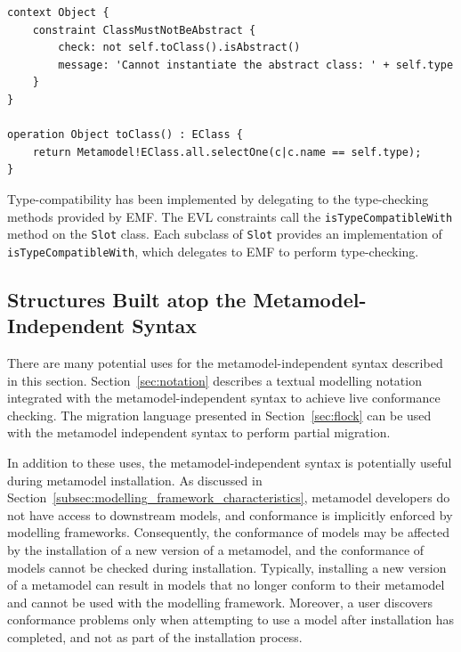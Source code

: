 \begin{lstlisting}[caption=A constraint (in EVL) to check that only concrete metamodel types are instantiated., label=lst:conformance_constraint, language=EVL]
context Object {
	constraint ClassMustNotBeAbstract {
		check: not self.toClass().isAbstract()
		message: 'Cannot instantiate the abstract class: ' + self.type
	}
}

operation Object toClass() : EClass {
	return Metamodel!EClass.all.selectOne(c|c.name == self.type);
}
\end{lstlisting}

Type-compatibility has been implemented by delegating to the type-checking methods provided by EMF. The EVL constraints call the \texttt{isTy\-peCo\-mp\-at\-ib\-leWi\-th} method on the \texttt{Sl\-ot} class. Each subclass of \texttt{Sl\-ot} provides an implementation of \texttt{isTy\-peCo\-mp\-at\-ib\-leWi\-th}, which delegates to EMF to perform type-checking.


\subsection{Structures Built atop the Metamodel-Independent Syntax}
There are many potential uses for the metamodel-independent syntax described in this section. Section~\ref{sec:notation} describes a textual modelling notation integrated with the metamodel-independent syntax to achieve live conformance checking. The migration language presented in Section~\ref{sec:flock} can be used with the metamodel independent syntax to perform partial migration.

In addition to these uses, the metamodel-independent syntax is potentially useful during metamodel installation. As discussed in Section~\ref{subsec:modelling_framework_characteristics}, metamodel developers do not have access to downstream models, and conformance is implicitly enforced by modelling frameworks. Consequently, the conformance of models may be affected by the installation of a new version of a metamodel, and the conformance of models cannot be checked during installation. Typically, installing a new version of a metamodel can result in models that no longer conform to their metamodel and cannot be used with the modelling framework. Moreover, a user discovers conformance problems only when attempting to use a model after installation has completed, and not as part of the installation process.

